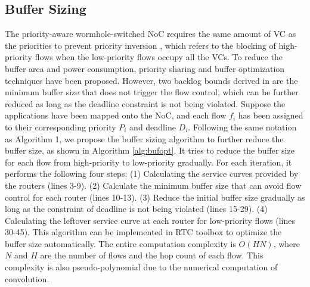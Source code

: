 \documentclass[10pt,journal]{IEEEtran}
\begin{document}
\subsection{Buffer Sizing}\label{bufferopt}
The priority-aware wormhole-switched NoC \cite{Shi:2008:RCA:1397757.1397996} requires the same amount of VC as the priorities to prevent priority inversion \cite{707545}, which refers to the blocking of high-priority flows when the low-priority flows occupy all the VCs. To reduce the buffer area and power consumption, priority sharing \cite{5161497} and buffer optimization \cite{189} techniques have been proposed. However, two backlog bounds derived in \cite{189} are the minimum buffer size that does not trigger the flow control, which can be further reduced as long as the deadline constraint is not being violated. Suppose the applications have been mapped onto the NoC, and each flow $f_i$ has been assigned to their corresponding priority $P_i$ and deadline $D_i$. Following the same notation as Algorithm 1, we propose the buffer sizing algorithm to further reduce the buffer size, as shown in Algorithm \ref{alg:bufopt}. It tries to reduce the buffer size for each flow from high-priority to low-priority gradually. For each iteration, it performs the following four steps: (1) Calculating the service curves provided by the routers (lines 3-9). (2) Calculate the minimum buffer size that can avoid flow control for each router (lines 10-13). (3) Reduce the initial buffer size gradually as long as the constraint of deadline is not being violated (lines 15-29). (4) Calculating the leftover service curve at each router for low-priority flows (lines 30-45). This algorithm can be implemented in RTC toolbox \cite{rtc} to optimize the buffer size automatically. The entire computation complexity is $O(HN)$, where $N$ and $H$ are the number of flows and the hop count of each flow. This complexity is also pseudo-polynomial due to the numerical computation of convolution.
\end{document}
